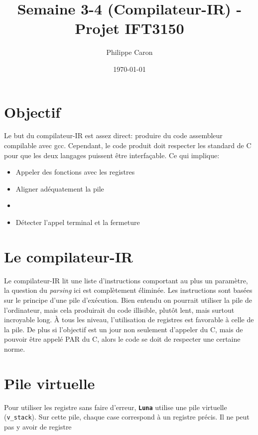 \documentclass{article}
\title{Semaine 3-4 (Compilateur-IR) - Projet IFT3150}
\date{\today}
\author{Philippe Caron}
\newcommand{\luna}{\textbf{\texttt{Luna}}}
\begin{document}
\maketitle

\section{Objectif}
Le but du compilateur-IR est assez direct: produire du code assembleur compilable avec gcc. Cependant, le code produit doit respecter les standard de C pour que les deux langages puissent être interfaçable. Ce qui implique:
\begin{itemize}
\item Appeler des fonctions avec les registres
\item Aligner adéquatement la pile
\item 
\item Détecter l'appel terminal et la fermeture
\end{itemize}

\section{Le compilateur-IR}
Le compilateur-IR lit une liste d'instructions comportant au plus un paramètre, la question du \textit{parsing} ici est complètement éliminée. Les instructions sont basées sur le principe d'une pile d'exécution. Bien entendu on pourrait utiliser la pile de l'ordinateur, mais cela produirait du code illisible, plutôt lent, mais surtout incroyable long. À tous les niveau, l'utilisation de registres est favorable à celle de la pile. De plus si l'objectif est un jour non seulement d'appeler du C, mais de pouvoir être appelé PAR du C, alors le code se doit de respecter une certaine norme.

\section{Pile virtuelle}
Pour utiliser les registre sans faire d'erreur, \luna{} utilise une pile virtuelle (\texttt{v\_{}stack}). Sur cette pile, chaque case correspond à un registre précis. Il ne peut pas y avoir de registre 
\end{document}

